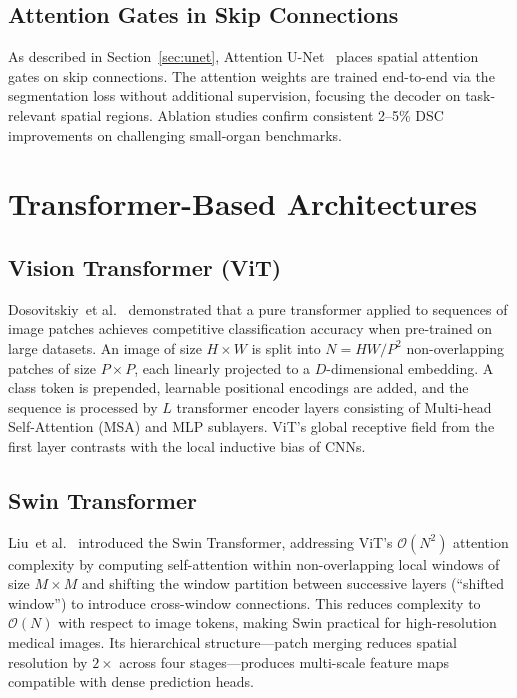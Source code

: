 \documentclass[preprint,12pt,authoryear]{elsarticle}
\begin{document}
\subsection{Attention Gates in Skip Connections}
\label{sec:attgate}

As described in Section~\ref{sec:unet}, Attention U-Net~\citep{oktay2018}
places spatial attention gates on skip connections. The attention weights are
trained end-to-end via the segmentation loss without additional supervision,
focusing the decoder on task-relevant spatial regions. Ablation studies confirm
consistent 2--5\% DSC improvements on challenging small-organ benchmarks.

\section{Transformer-Based Architectures}
\label{sec:transformer}

\subsection{Vision Transformer (ViT)}
\label{sec:vit}

Dosovitskiy~et al.~\citep{dosovitskiy2020vit} demonstrated that a pure
transformer applied to sequences of image patches achieves competitive
classification accuracy when pre-trained on large datasets. An image of size
$H \times W$ is split into $N = HW/P^2$ non-overlapping patches of size
$P \times P$, each linearly projected to a $D$-dimensional embedding. A class
token is prepended, learnable positional encodings are added, and the sequence
is processed by $L$ transformer encoder layers consisting of Multi-head
Self-Attention (MSA) and MLP sublayers. ViT's global receptive field from
the first layer contrasts with the local inductive bias of CNNs.

\subsection{Swin Transformer}
\label{sec:swin}

Liu~et al.~\citep{liu2021swin} introduced the Swin Transformer, addressing
ViT's $\mathcal{O}(N^2)$ attention complexity by computing self-attention
within non-overlapping local windows of size $M \times M$ and shifting the
window partition between successive layers (``shifted window'') to introduce
cross-window connections. This reduces complexity to $\mathcal{O}(N)$ with
respect to image tokens, making Swin practical for high-resolution medical
images. Its hierarchical structure---patch merging reduces spatial resolution
by $2\times$ across four stages---produces multi-scale feature maps compatible
with dense prediction heads.
\end{document}
